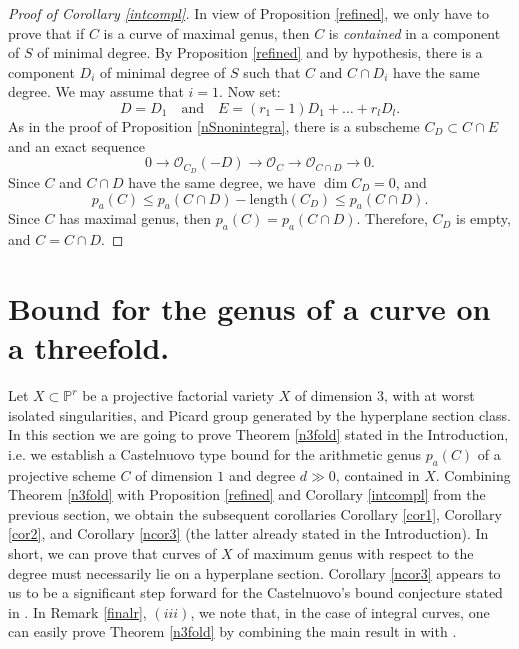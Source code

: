 \documentclass[9pt,a4paper]{amsart}
\theoremstyle{plain}
\theoremstyle{definition}
\theoremstyle{remark}
\begin{document}
\smallskip
\begin{proof}[Proof of Corollary \ref{intcompl}]
In view of Proposition \ref{refined}, we only have to prove that if
$C$ is a curve of maximal genus, then $C$ is {\it contained} in a
component of $S$ of minimal degree. By Proposition \ref{refined} and
by hypothesis, there is a component $D_i$ of minimal degree of $S$
such that $C$ and $C\cap D_i$ have the same degree. We may assume
that $i=1$. Now set:
$$
D=D_1\quad {\text{and}}\quad E=(r_1-1)D_1+ \dots +r_lD_l.
$$
As in the proof of Proposition \ref{nSnonintegra}, there is a
subscheme $C_D\subset C\cap E$ and  an exact sequence
$$
0\to \mathcal O_{C_D}(-D)\to \mathcal O_C\to \mathcal O_{C\cap D}\to
0.
$$
Since $C$ and $C\cap D$ have the same degree, we have $\dim C_D=0$,
and
$$
p_a(C)\leq p_a(C\cap D)-{\text{length}}(C_D)\leq p_a(C\cap D).
$$
Since $C$ has maximal genus, then $p_a(C)=p_a(C\cap D)$. Therefore,
$C_D$ is empty, and $C=C\cap D$.
\end{proof}



\section{Bound for the genus of a curve on a threefold.}


Let $X\subset \mathbb P^r$ be a projective factorial variety $X$ of
dimension $3$, with at worst isolated singularities, and Picard
group generated by the hyperplane section class. In this section
we are going to prove Theorem \ref{n3fold} stated in the Introduction, i.e.
we establish a Castelnuovo type bound for the arithmetic genus $p_a(C)$
of a projective scheme $C$ of dimension $1$ and degree $d\gg0$,
contained in $X$. Combining Theorem
\ref{n3fold} with Proposition \ref{refined} and Corollary
\ref{intcompl} from the previous section, we obtain the subsequent
corollaries Corollary \ref{cor1}, Corollary \ref{cor2}, and
Corollary \ref{ncor3} (the latter already stated in the Introduction). In short, we can prove that curves of $X$ of
maximum genus with respect to the degree must necessarily lie on a
hyperplane section. Corollary \ref{ncor3} appears to us to be a
significant step forward for the Castelnuovo's bound conjecture stated
in \cite[Conjecture 1.1]{Liu}. In Remark \ref{finalr}, $(iii)$, we
note that, in the case of integral curves, one can easily prove
Theorem \ref{n3fold} by combining  the main result in \cite{CCD} with
\cite[Lemma]{D3}.
\end{document}
